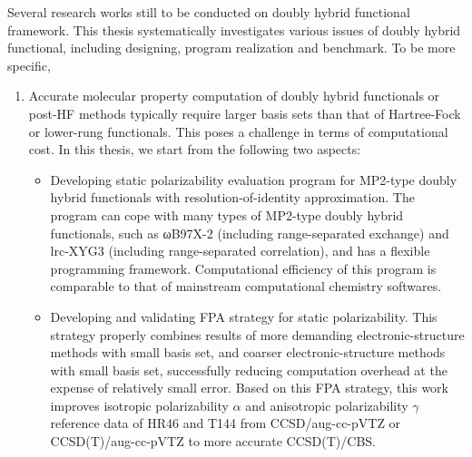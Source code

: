 \begin{abstract*}
Several research works still to be conducted on doubly hybrid functional framework. This thesis systematically investigates various issues of doubly hybrid functional, including designing, program realization and benchmark. To be more specific,
\begin{enumerate}[nosep]
\item Accurate molecular property computation of doubly hybrid functionals or post-HF methods typically require larger basis sets than that of Hartree-Fock or lower-rung functionals. This poses a challenge in terms of computational cost. In this thesis, we start from the following two aspects:
\begin{itemize}[nosep]
    \item Developing static polarizability evaluation program for MP2-type doubly hybrid functionals with resolution-of-identity approximation. The program can cope with many types of MP2-type doubly hybrid functionals, such as ωB97X-2 (including range-separated exchange) and lrc-XYG3 (including range-separated correlation), and has a flexible programming framework. Computational efficiency of this program is comparable to that of mainstream computational chemistry softwares.
    \item Developing and validating FPA strategy for static polarizability. This strategy properly combines results of more demanding elec\-tronic-structure methods with small basis set, and coarser electronic-struc\-ture methods with small basis set, successfully reducing computation overhead at the expense of relatively small error. Based on this FPA strategy, this work improves isotropic polarizability $\alpha$ and anisotropic polarizability $\gamma$ reference data of HR46 and T144 from CCSD/aug-cc-pVTZ or CCSD(T)/aug-cc-pVTZ to more accurate CCSD(T)/CBS.
\end{itemize}

\end{enumerate}
\end{abstract*}
